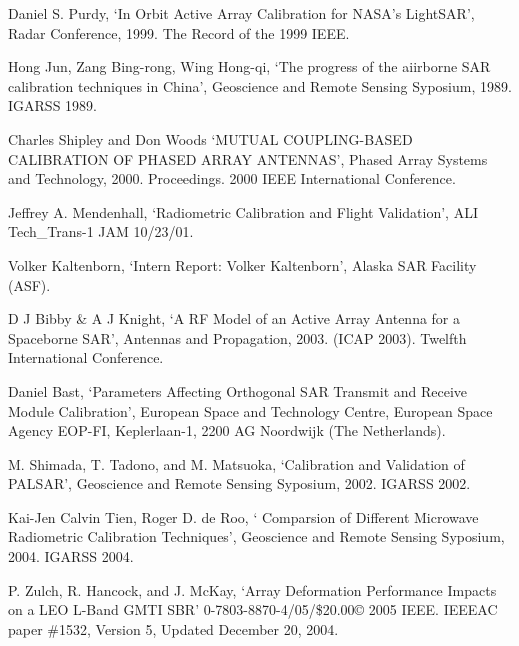 \documentclass[a4paper,10pt]{article}
\begin{document}
\begin{enumerate}[ {[}1{]} ]
		\item \label{ppr:ext3} Daniel S. Purdy, \enquote*{In Orbit Active Array
		Calibration for NASA’s LightSAR}, Radar Conference, 1999. The Record of
		the 1999 IEEE.
		
		\item \label{ppr:punc-ext1} Hong Jun, Zang Bing-rong, Wing Hong-qi, 
		\enquote*{The progress of the aiirborne SAR calibration techniques in 
		China}, Geoscience and Remote Sensing Syposium, 1989. IGARSS 1989.

		\item \label{ppr:mutual2} Charles Shipley and Don Woods \enquote*{MUTUAL
		COUPLING-BASED CALIBRATION OF PHASED ARRAY ANTENNAS}, Phased Array 
		Systems and Technology, 2000. Proceedings. 2000 IEEE International 
		Conference.
		
		\item \label{ppr:rad4} Jeffrey A. Mendenhall, \enquote*{Radiometric 
		Calibration and Flight Validation}, ALI Tech\_Trans-1 JAM 10/23/01.

		\item \label{ppr:rad5} Volker Kaltenborn, \enquote*{Intern Report: 
		Volker Kaltenborn}, Alaska SAR Facility (ASF).
		
		\item \label{ppr:classic4} D J Bibby \& A J Knight, \enquote*{A RF Model
		of an Active Array Antenna for a Spaceborne SAR}, Antennas and 
		Propagation, 2003. (ICAP 2003). Twelfth International Conference.
		
		\item \label{ppr:classic5} Daniel Bast, \enquote*{Parameters Affecting 
		Orthogonal SAR Transmit and Receive Module Calibration}, European Space
		and Technology Centre, European Space Agency EOP-FI, Keplerlaan-1, 2200
		AG Noordwijk (The Netherlands).
		
		\item \label{ppr:puncTrgt3} M. Shimada, T. Tadono, and M. Matsuoka,
		\enquote*{Calibration and Validation of PALSAR}, Geoscience and Remote 
		Sensing Syposium, 2002. IGARSS 2002.
		
		\item \label{ppr:rad6} Kai-Jen Calvin Tien, Roger D. de Roo, \enquote*{
		Comparsion of Different Microwave Radiometric Calibration Techniques}, 
		Geoscience and Remote Sensing Syposium, 2004. IGARSS 2004.
		
		\item \label{ppr:aligment3} P. Zulch, R. Hancock, and J. McKay, 
		\enquote*{Array Deformation Performance Impacts on a LEO L-Band GMTI 
		SBR} 0-7803-8870-4/05/\$20.00© 2005 IEEE. IEEEAC paper \#1532, Version 
		5, Updated December 20, 2004.


\end{enumerate}
\end{document}

